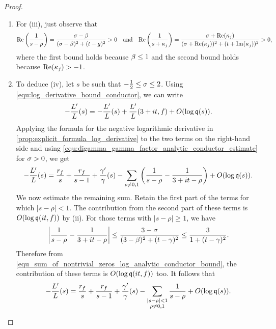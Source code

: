 \documentclass[12pt]{article}
\begin{document}
\begin{proof}
\begin{enumerate}[label*=(\roman*)]
        \[
          \sum_{\rho \neq 0,1}\Re\left(\frac{1}{s-\rho}\right) \ll \log{\mf{q}(iT,f)}.
        \]
        But as
        \[
          \frac{2}{9+(T-\g)^{2}} \le \Re\left(\frac{1}{s-\rho}\right) \le \frac{3}{4+(T-\g)^{2}},
        \]
        we obtain
        \begin{equation}\label{equ_sum_of_nontrivial_zeros_log_analytic_conductor_bound}
          \sum_{\rho \neq 0,1}\frac{1}{1+(T-\g)^{2}} \ll \log{\mf{q}(iT,f)},
        \end{equation}
        which is stronger than the first statement of (ii) since all of the terms in the sum are positive. The second statement is also clear.
        \item For (iii), just observe that
        \[
          \mathrm{Re}\left(\frac{1}{s-\rho}\right) = \frac{\sigma-\beta}{(\sigma-\beta)^{2}+(t-
          g)^{2}} > 0 \quad \text{and} \quad \mathrm{Re}\left(\frac{1}{s+\kappa_{j}}\right) = \frac{\sigma+\mathrm{Re}(\kappa_{j})}{(\sigma+\mathrm{Re}(\kappa_{j}))^{2}+(t+\mathrm{Im}(\kappa_{j}))^{2}} > 0,
        \]
        where the first bound holds because \(\beta \le 1\) and the second bound holds because \(\mathrm{Re}(\kappa_{j}) > -1\).
        \item To deduce (iv), let \(s\) be such that \(-\frac{1}{2} \le \sigma \le 2\). Using \cref{equ:log_derivative_bound_conductor}, we can write
        \[
          -\frac{L'}{L}(s) = -\frac{L'}{L}(s)+\frac{L'}{L}(3+it,f)+O(\log{\mathfrak{q}(s)}).
        \]
        Applying the formula for the negative logarithmic derivative in \cref{prop:explicit_formula_log_derivative} to the two terms on the right-hand side and using \cref{equ:digamma_gamma_factor_analytic_conductor_estimate} for \(\sigma > 0\), we get
        \[
          -\frac{L'}{L}(s) = \frac{r_{f}}{s}+\frac{r_{f}}{s-1}+\frac{\gamma'}{\gamma}(s)-\sum_{\rho \neq 0,1}\left(\frac{1}{s-\rho}-\frac{1}{3+it-\rho}\right)+O(\log{\mathfrak{q}(s)}).
        \]
        We now estimate the remaining sum. Retain the first part of the terms for which \(|s-\rho| < 1\). The contribution from the second part of these terms is \(O(\log{\mathfrak{q}(it,f)})\) by (ii). For those terms with \(|s-\rho| \ge 1\), we have
        \[
          \left|\frac{1}{s-\rho}-\frac{1}{3+it-\rho}\right| \le \frac{3-\sigma}{(3-\beta)^{2}+(t-\gamma)^{2}} \le \frac{3}{1+(t-\gamma)^{2}}.
        \]
        Therefore from \cref{equ_sum_of_nontrivial_zeros_log_analytic_conductor_bound}, the contribution of these terms is \(O(\log{\mathfrak{q}(it,f)})\) too. It follows that
        \[
          -\frac{L'}{L}(s) = \frac{r_{f}}{s}+\frac{r_{f}}{s-1}+\frac{\gamma'}{\gamma}(s)-\sum_{\substack{|s-\rho| < 1 \\ \rho \neq 0,1}}\frac{1}{s-\rho}+O(\log{\mathfrak{q}(s)}).
\]
\end{enumerate}
\end{proof}
\end{document}
